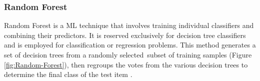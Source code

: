 \documentclass[12pt]{diazessay}
\begin{document}
        

    \subsubsection{Random Forest}
    \hspace{0.7cm} Random Forest is a ML technique that involves training individual classifiers and combining their predictors. It is reserved exclusively for decision tree classifiers and is employed for classification or regression problems. 
    This method generates a set of decision trees from a randomly selected subset of training samples (Figure \ref{fig:Random-Forest}), then regroups the votes from the various decision trees to determine the final class of the test item \cite{azhari2019adaptation}.
    
\end{document}
